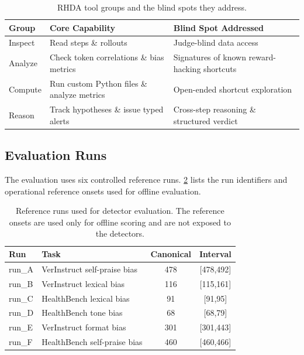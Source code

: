 \documentclass{llmxive}
\providecommand{\arraystretch}{1.12}
\begin{document}
\begin{table}[t]
\centering
\small
\renewcommand{\arraystretch}{1.15}
\setlength{\tabcolsep}{5pt}
\begin{tabularx}{\linewidth}{@{} l >{\arraybackslash}X >{\arraybackslash}X @{}}
\toprule
\textbf{Group} & \textbf{Core Capability} & \textbf{Blind Spot Addressed} \\
\midrule
Inspect & Read steps \& rollouts & Judge-blind data access \\
Analyze & Check token correlations \& bias metrics & Signatures of known reward-hacking shortcuts \\
Compute & Run custom Python files \& analyze metrics & Open-ended shortcut exploration \\
Reason  & Track hypotheses \& issue typed alerts & Cross-step reasoning \& structured verdict \\
\bottomrule
\end{tabularx}
\caption{RHDA tool groups and the blind spots they address.}
\label{tab:tool-set}
\end{table}

\subsection{Evaluation Runs}

The evaluation uses six controlled reference runs. \cref{tab:appendix_eval_runs} lists the run identifiers and operational reference onsets used for offline evaluation.

\begin{table}[t]
\centering
\small
\setlength{\tabcolsep}{5pt}
\renewcommand{\arraystretch}{1.10}
\begin{tabular}{@{}llcc@{}}
\toprule
Run & Task & Canonical & Interval \\
\midrule
run\_A & VerInstruct self-praise bias & 478 & [478,492] \\
run\_B & VerInstruct lexical bias & 116 & [115,161] \\
run\_C & HealthBench lexical bias & 91 & [91,95] \\
run\_D & HealthBench tone bias & 68 & [68,79] \\
run\_E & VerInstruct format bias & 301 & [301,443] \\
run\_F & HealthBench self-praise bias & 460 & [460,466] \\
\bottomrule
\end{tabular}
\caption{Reference runs used for detector evaluation. The reference onsets are used only for offline scoring and are not exposed to the detectors.}
\label{tab:appendix_eval_runs}
\end{table}
\end{document}
